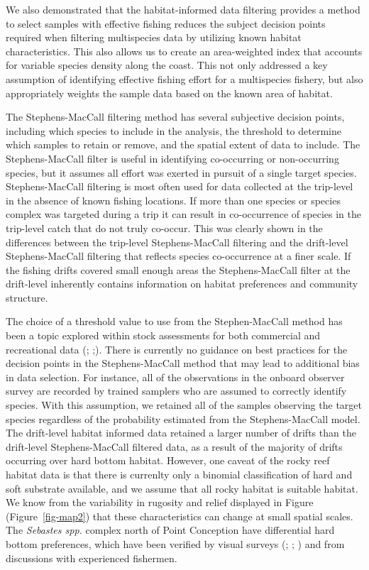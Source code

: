 \documentclass[
  12pt,
  authoryear,
  preprint,
  3p]{elsarticle}
\begin{document}
We also demonstrated that the habitat-informed data filtering provides a
method to select samples with effective fishing reduces the subject
decision points required when filtering multispecies data by utilizing
known habitat characteristics. This also allows us to create an
area-weighted index that accounts for variable species density along the
coast. This not only addressed a key assumption of identifying effective
fishing effort for a multispecies fishery, but also appropriately
weights the sample data based on the known area of habitat.

The Stephens-MacCall filtering method has several subjective decision
points, including which species to include in the analysis, the
threshold to determine which samples to retain or remove, and the
spatial extent of data to include. The Stephens-MacCall filter is useful
in identifying co-occurring or non-occurring species, but it assumes all
effort was exerted in pursuit of a single target species.
Stephens-MacCall filtering is most often used for data collected at the
trip-level in the absence of known fishing locations. If more than one
species or species complex was targeted during a trip it can result in
co-occurrence of species in the trip-level catch that do not truly
co-occur. This was clearly shown in the differences between the
trip-level Stephens-MacCall filtering and the drift-level
Stephens-MacCall filtering that reflects species co-occurrence at a
finer scale. If the fishing drifts covered small enough areas the
Stephens-MacCall filter at the drift-level inherently contains
information on habitat preferences and community structure.

The choice of a threshold value to use from the Stephen-MacCall method
has been a topic explored within stock assessments for both commercial
and recreational data (\citet{Dettloff:2021:ISA};
\citet{Cope:2015:DMS};\citet{DucharmeBarth:2018:IAG}). There is
currently no guidance on best practices for the decision points in the
Stephens-MacCall method that may lead to additional bias in data
selection. For instance, all of the observations in the onboard observer
survey are recorded by trained samplers who are assumed to correctly
identify species. With this assumption, we retained all of the samples
observing the target species regardless of the probability estimated
from the Stephens-MacCall model. The drift-level habitat informed data
retained a larger number of drifts than the drift-level Stephens-MacCall
filtered data, as a result of the majority of drifts occurring over hard
bottom habitat. However, one caveat of the rocky reef habitat data is
that there is currenlty only a binomial classification of hard and soft
substrate available, and we assume that all rocky habitat is suitable
habitat. We know from the variability in rugosity and relief displayed
in Figure (Figure~\ref{fig-map2}) that these characteristics can change
at small spatial scales. The \emph{Sebastes spp.} complex north of Point
Conception have differential hard bottom preferences, which have been
verified by visual surveys (\citet{Laidig:2009:DFH};
\citet{Anderson:2007:MHA}; \citet{Haggarty:2006:CIR} ) and from
discussions with experienced fishermen.
\end{document}
